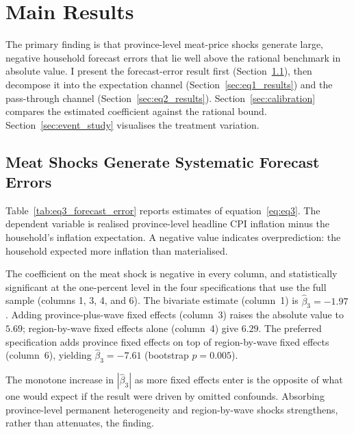 
\section{Main Results}\label{sec:results}

The primary finding is that province-level meat-price shocks
generate large, negative household forecast errors that lie
well above the rational benchmark in absolute value.
I present the forecast-error result first
(Section~\ref{sec:eq3_results}), then decompose it into the
expectation channel (Section~\ref{sec:eq1_results}) and the
pass-through channel (Section~\ref{sec:eq2_results}).
Section~\ref{sec:calibration} compares the estimated
coefficient against the rational bound.
Section~\ref{sec:event_study} visualises the treatment
variation.

\subsection{Meat Shocks Generate Systematic Forecast Errors}%
\label{sec:eq3_results}



Table~\ref{tab:eq3_forecast_error} reports estimates of
equation~\eqref{eq:eq3}.
The dependent variable is realised province-level headline CPI
inflation minus the household's inflation expectation.
A negative value indicates overprediction: the household
expected more inflation than materialised.

The coefficient on the meat shock is negative in every column,
and statistically significant at the one-percent level in the
four specifications that use the full sample (columns 1, 3,
4, and 6).
The bivariate estimate (column~1) is $\hat{\beta}_3 = -1.97$.
Adding province-plus-wave fixed effects (column~3) raises
the absolute value to $5.69$; region-by-wave fixed effects
alone (column~4) give $6.29$.
The preferred specification adds province fixed effects on top
of region-by-wave fixed effects (column~6), yielding
$\hat{\beta}_3 = -7.61$ (bootstrap $p = 0.005$).

The monotone increase in $|\hat{\beta}_3|$ as more fixed
effects enter is the opposite of what one would expect if
the result were driven by omitted confounds.
Absorbing province-level permanent heterogeneity and
region-by-wave shocks strengthens, rather than attenuates,
the finding.

